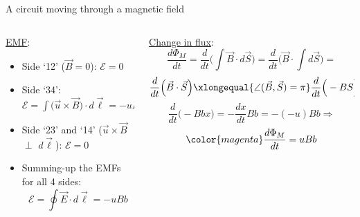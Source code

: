 \begin{frame}{A circuit moving through a magnetic field}
\begin{columns}[t]
  \begin{column}{0.50\textwidth}
  {\scriptsize
    \underline{EMF}:\\
    \vspace{0.1cm}
    \begin{itemize}
       \item Side `12' ($\vec{B}=0$):
             $\mathcal{E} = 0$
       \item Side `34':
             $\mathcal{E} = \int \Big( \vec{u} \times \vec{B} \Big) \cdot d\vec{\ell} = -uBb$
       \item Side `23' and `14' ($\vec{u} \times \vec{B}$ $\perp$ $d\vec{\ell}$):
             $\mathcal{E} = 0$
       \item Summing-up the EMFs for all 4 sides:
            {\color{magenta}
              \begin{equation*}
               \mathcal{E} = \oint \vec{E} \cdot d\vec{\ell} = -uBb
              \end{equation*}
            }
    \end{itemize}
  }
  \end{column}
  \begin{column}{0.50\textwidth}
  {\scriptsize
    \underline{Change in flux}:\\
    \begin{equation*}
      \frac{d\Phi_{M}}{dt} =
        \frac{d}{dt} \Big( \int \vec{B} \cdot d\vec{S} \Big) =
        \frac{d}{dt} \Big( \vec{B} \cdot \int d\vec{S} \Big) =
    \end{equation*}
    \begin{equation*}
          \frac{d}{dt} \Big( \vec{B} \cdot \vec{S} \Big) \xlongequal{\angle(\vec{B}, \vec{S}) = \pi}
          \frac{d}{dt} \Big( -BS \Big) \xlongequal{S=bx}
    \end{equation*}
    \begin{equation*}
        \frac{d}{dt} \Big( -Bbx \Big) =
        - \frac{dx}{dt} B b = -(-u) B b \Rightarrow
    \end{equation*}
    \begin{equation*}
        {\color{magenta}
          \frac{d\Phi_{M}}{dt} = uBb
        }
    \end{equation*}
  }
  \end{column}
\end{columns}

\end{frame}

%
%
%


